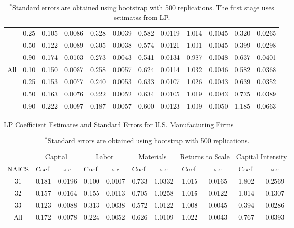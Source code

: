\documentclass[12pt]{article}
\begin{document}
\begin{appendices}
\begin{table}[H]
\begin{tabular}{cccccccccccc}
   & 0.25 & 0.105 & 0.0086 & 0.328 & 0.0039 & 0.582 & 0.0119 & 1.014 & 0.0045 & 0.320 & 0.0265 \\ 
   & 0.50 & 0.122 & 0.0089 & 0.305 & 0.0038 & 0.574 & 0.0121 & 1.001 & 0.0045 & 0.399 & 0.0298 \\ 
   & 0.90 & 0.174 & 0.0103 & 0.273 & 0.0043 & 0.541 & 0.0134 & 0.987 & 0.0048 & 0.637 & 0.0401 \\ 
  All & 0.10 & 0.150 & 0.0087 & 0.258 & 0.0057 & 0.624 & 0.0114 & 1.032 & 0.0046 & 0.582 & 0.0368 \\ 
   & 0.25 & 0.153 & 0.0077 & 0.240 & 0.0053 & 0.633 & 0.0107 & 1.026 & 0.0043 & 0.639 & 0.0352 \\ 
   & 0.50 & 0.163 & 0.0076 & 0.222 & 0.0052 & 0.634 & 0.0105 & 1.019 & 0.0043 & 0.735 & 0.0389 \\ 
   & 0.90 & 0.222 & 0.0097 & 0.187 & 0.0057 & 0.600 & 0.0123 & 1.009 & 0.0050 & 1.185 & 0.0663 \\ 
   \hline
\end{tabular}
\caption*{\footnotesize $^{*}$Standard errors are obtained using bootstrap with 500 replications. The first stage uses estimates from LP.}
\label{USQLP}
\end{table}

\begin{table}[H]
\centering
\caption{LP Coefficient Estimates and Standard Errors for U.S. Manufacturing Firms}
\small
\begin{tabular}{ccccccccccc}
  \hline\hline & \multicolumn{2}{c}{Capital} & \multicolumn{2}{c}{Labor} & \multicolumn{2}{c}{Materials} & \multicolumn{2}{c}{Returns to Scale} & \multicolumn{2}{c}{Capital Intensity}\\ \cmidrule(lr){2-3} \cmidrule(lr){4-5} \cmidrule(lr){6-7} \cmidrule(lr){8-9} \cmidrule(lr){10-11}NAICS & Coef. & s.e & Coef. & s.e & Coef. & s.e & Coef. & s.e & Coef. & s.e \\ 
  \hline
31 & 0.181 & 0.0196 & 0.100 & 0.0107 & 0.733 & 0.0332 & 1.015 & 0.0165 & 1.802 & 0.2569 \\ 
  32 & 0.157 & 0.0164 & 0.155 & 0.0113 & 0.705 & 0.0258 & 1.016 & 0.0122 & 1.014 & 0.1307 \\ 
  33 & 0.123 & 0.0088 & 0.313 & 0.0038 & 0.572 & 0.0122 & 1.008 & 0.0045 & 0.394 & 0.0286 \\ 
  All & 0.172 & 0.0078 & 0.224 & 0.0052 & 0.626 & 0.0109 & 1.022 & 0.0043 & 0.767 & 0.0393 \\ 
   \hline
\end{tabular}
\caption*{\footnotesize $^{*}$Standard errors are obtained using bootstrap with 500 replications.}
\label{USLP}
\end{table}


\end{appendices}
\end{document}
